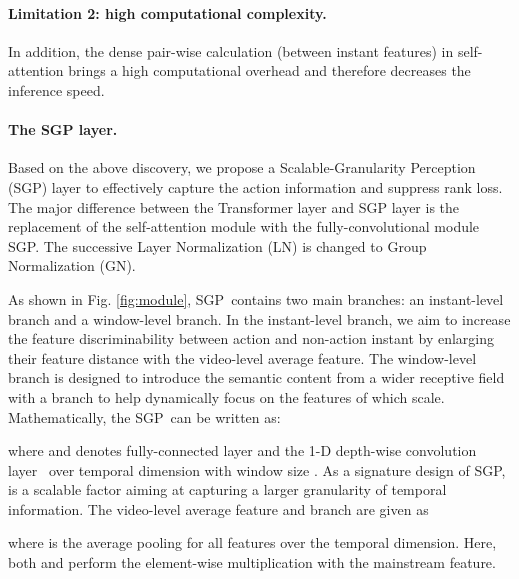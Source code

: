 \documentclass[10pt,twocolumn,letterpaper]{article}
\newcommand{\figref}[1]{Fig. \ref{#1}}
\def\modulename{SGP}
\begin{document}
\paragraph{Limitation 2: high computational complexity.}
In addition, the dense pair-wise calculation (between instant features) in self-attention brings a high computational overhead and therefore decreases the inference speed.

\begin{figure}[t]
\end{figure}

\paragraph{The SGP layer.}
Based on the above discovery, we propose a Scalable-Granularity Perception (\modulename) layer to effectively capture the action information and suppress rank loss. The major difference between the Transformer layer and SGP layer is the replacement of the self-attention module with the fully-convolutional module SGP. The successive Layer Normalization\cite{ba2016layer} (LN) is changed to Group Normalization\cite{wu2018group} (GN).

As shown in \figref{fig:module}, \modulename~contains two main branches: an instant-level branch and a window-level branch. 
In the instant-level branch, we aim to increase the feature discriminability between action and non-action instant by enlarging their feature distance with the video-level average feature. The window-level branch is designed to introduce the semantic content from a wider receptive field with a branch  to help dynamically focus on the features of which scale.
Mathematically, the \modulename~can be written as:

where  and  denotes fully-connected layer and the 1-D depth-wise convolution layer~\cite{chollet2017xception} over temporal dimension with window size .
As a signature design of \modulename,  is a scalable factor aiming at capturing a larger granularity of temporal information.
The video-level average feature  and branch  are given as

where  is the average pooling for all features over the temporal dimension. Here, both  and  perform the element-wise multiplication with the mainstream feature. 
\end{document}
